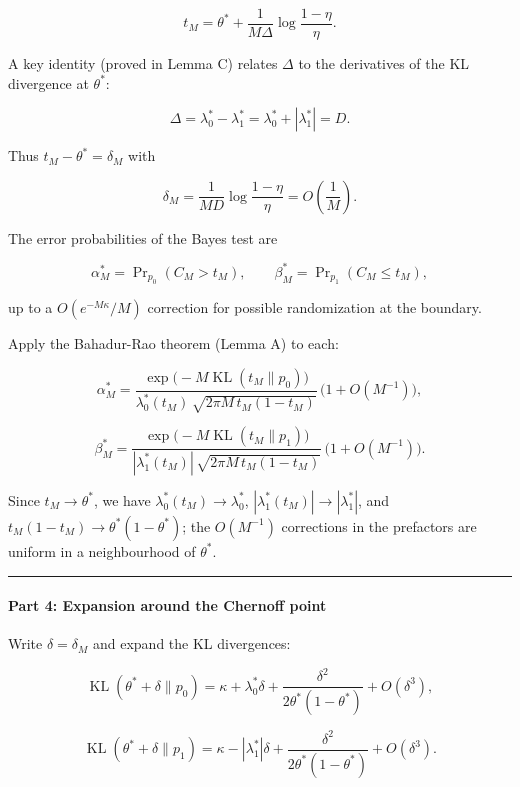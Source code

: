 \documentclass[12pt]{article}
\begin{document}
\[
t_M = \theta^* + \frac{1}{M\Delta}\log\frac{1-\eta}{\eta}.
\]

A key identity (proved in Lemma C) relates \(\Delta\) to the derivatives
of the KL divergence at \(\theta^*\):

\[
\Delta = \lambda_0^* - \lambda_1^* = \lambda_0^* + |\lambda_1^*| = D.
\]

Thus \(t_M - \theta^* = \delta_M\) with

\[
\delta_M = \frac{1}{M D}\log\frac{1-\eta}{\eta} = O\!\left(\frac1M\right).
\]

The error probabilities of the Bayes test are

\[
\alpha_M^* = \Pr\nolimits_{p_0}(C_M > t_M),\qquad
\beta_M^* = \Pr\nolimits_{p_1}(C_M \le t_M),
\]

up to a \(O(e^{-M\kappa}/M)\) correction for possible randomization at
the boundary.

Apply the Bahadur-Rao theorem (Lemma A) to each:

\[
\alpha_M^* = \frac{\exp\!\bigl(-M\operatorname{KL}(t_M\|p_0)\bigr)}
{\lambda_0^*(t_M)\,\sqrt{2\pi M\,t_M(1-t_M)}}\,
\bigl(1 + O(M^{-1})\bigr),
\]

\[
\beta_M^* = \frac{\exp\!\bigl(-M\operatorname{KL}(t_M\|p_1)\bigr)}
{|\lambda_1^*(t_M)|\,\sqrt{2\pi M\,t_M(1-t_M)}}\,
\bigl(1 + O(M^{-1})\bigr).
\]

Since \(t_M \to \theta^*\), we have
\(\lambda_0^*(t_M) \to \lambda_0^*\),
\(|\lambda_1^*(t_M)| \to |\lambda_1^*|\), and
\(t_M(1-t_M) \to \theta^*(1-\theta^*)\); the \(O(M^{-1})\) corrections
in the prefactors are uniform in a neighbourhood of \(\theta^*\).

\begin{center}\rule{0.5\linewidth}{0.5pt}\end{center}

\paragraph{Part 4: Expansion around the Chernoff
point}\label{part-4-expansion-around-the-chernoff-point}

Write \(\delta = \delta_M\) and expand the KL divergences:

\[
\operatorname{KL}(\theta^*+\delta\|p_0) = \kappa + \lambda_0^*\delta
+ \frac{\delta^2}{2\theta^*(1-\theta^*)} + O(\delta^3),
\]

\[
\operatorname{KL}(\theta^*+\delta\|p_1) = \kappa - |\lambda_1^*|\delta
+ \frac{\delta^2}{2\theta^*(1-\theta^*)} + O(\delta^3).
\]
\end{document}
